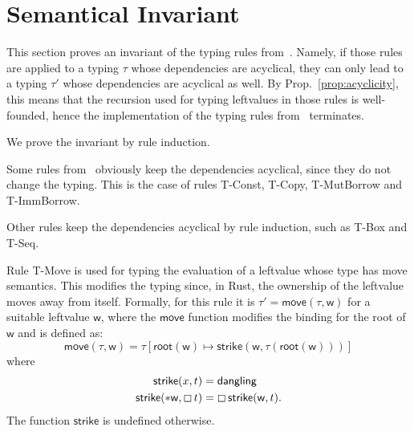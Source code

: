 \section{Semantical Invariant}\label{sec:invariant}

This section proves an invariant of the typing rules
from~\cite{Pearce21}. Namely,
if those rules are applied to a typing $\tau$ whose dependencies are acyclical,
they can only lead to a typing $\tau'$ whose dependencies are acyclical as well.
By Prop.~\ref{prop:acyclicity}, this means that the recursion used for
typing leftvalues in those rules is well-founded,
hence the implementation of the typing rules from~\cite{Pearce21} terminates.

We prove the invariant by rule induction.

Some rules from~\cite{Pearce21} obviously keep the dependencies acyclical,
since they do not change the typing. This is the case of rules
\textsf{T-Const}, \textsf{T-Copy}, \textsf{T-MutBorrow} and
\textsf{T-ImmBorrow}.

Other rules keep the dependencies acyclical by rule induction,
such as \textsf{T-Box} and \textsf{T-Seq}.

Rule \textsf{T-Move} is used for typing the evaluation of a leftvalue
whose type has move semantics. This modifies the typing since, in Rust,
the ownership of the leftvalue moves away from itself.
Formally, for this rule it is $\tau'=\mathsf{move}(\tau,\mathsf{w})$
for a suitable leftvalue $\mathsf{w}$,
where the $\mathsf{move}$ function
modifies the binding for the root of $\mathsf{w}$ and is defined as:
\[
\mathsf{move}(\tau,\mathsf{w})=\tau[\mathsf{root}(\mathsf{w})\mapsto
  \mathsf{strike}(\mathsf{w},\tau(\mathsf{root}(\mathsf{w})))]
\]
where
\begin{align*}
  \mathsf{strike}(x,t)&=\mathsf{dangling}\\
  \mathsf{strike}(\mathtt{*}\mathsf{w},\boxempty\,{t})&=
  \boxempty\,{\mathsf{strike}(\mathsf{w},t)}.
\end{align*}
The function $\mathsf{strike}$ is undefined otherwise.

